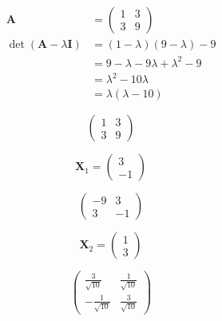 \documentclass{article}
\begin{document}
\setcounter{subsubsection}{12}
\subsubsection{}

\begin{align*}
  \mathbf{A}                             & = \begin{pmatrix}
                                               1 & 3 \\
                                               3 & 9
                                             \end{pmatrix}                          \\
  \det (\mathbf{A} - \lambda \mathbf{I}) & = (1 - \lambda) (9 - \lambda) - 9         \\
                                         & = 9 - \lambda - 9 \lambda + \lambda^2 - 9 \\
                                         & = \lambda^2 - 10 \lambda                  \\
                                         & = \lambda (\lambda - 10)
\end{align*}

\[\begin{pmatrix}
    1 & 3 \\
    3 & 9
  \end{pmatrix}\]

\[\mathbf{X}_1 = \begin{pmatrix}
    3 \\
    -1
  \end{pmatrix}\]

\[\begin{pmatrix}
    -9 & 3  \\
    3  & -1
  \end{pmatrix}\]

\[\mathbf{X}_2 = \begin{pmatrix}
    1 \\
    3
  \end{pmatrix}\]

\[\begin{pmatrix}
    \frac{3}{\sqrt{10}}  & \frac{1}{\sqrt{10}} \\
    -\frac{1}{\sqrt{10}} & \frac{3}{\sqrt{10}}
  \end{pmatrix}\]

\setcounter{subsubsection}{18}
\subsubsection{}
\end{document}

